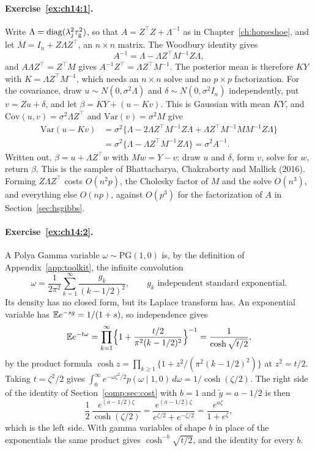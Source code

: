 \paragraph{Exercise~\ref{ex:ch14:1}.} Write $\Lambda = \mathrm{diag}(\lambda_j^2\tau_{\mathrm{g}}^2)$, so that $A = Z^\top Z + \Lambda^{-1}$ as in Chapter~\ref{ch:horseshoe}, and let $M = I_n + Z\Lambda Z^\top$, an $n \times n$ matrix. The Woodbury identity gives
\[
A^{-1} = \Lambda - \Lambda Z^\top M^{-1} Z\Lambda,
\]
and $A\Lambda Z^\top = Z^\top M$ gives $A^{-1}Z^\top = \Lambda Z^\top M^{-1}$. The posterior mean is therefore $KY$ with $K = \Lambda Z^\top M^{-1}$, which needs an $n \times n$ solve and no $p \times p$ factorization. For the covariance, draw $u \sim N(0, \sigma^2\Lambda)$ and $\delta \sim N(0, \sigma^2 I_n)$ independently, put $v = Zu + \delta$, and let $\beta = KY + (u - Kv)$. This is Gaussian with mean $KY$, and $\mathrm{Cov}(u, v) = \sigma^2\Lambda Z^\top$ and $\mathrm{Var}(v) = \sigma^2 M$ give
\begin{align*}
\mathrm{Var}(u - Kv) &= \sigma^2\bigl\{\Lambda - 2\Lambda Z^\top M^{-1}Z\Lambda + \Lambda Z^\top M^{-1}MM^{-1}Z\Lambda\bigr\}\\
&= \sigma^2\bigl\{\Lambda - \Lambda Z^\top M^{-1}Z\Lambda\bigr\} = \sigma^2 A^{-1}.
\end{align*}
Written out, $\beta = u + \Lambda Z^\top w$ with $Mw = Y - v$: draw $u$ and $\delta$, form $v$, solve for $w$, return $\beta$. This is the sampler of Bhattacharya, Chakraborty and Mallick (2016). Forming $Z\Lambda Z^\top$ costs $O(n^2p)$, the Cholesky factor of $M$ and the solve $O(n^3)$, and everything else $O(np)$, against $O(p^3)$ for the factorization of $A$ in Section~\ref{sec:hsgibbs}.

\paragraph{Exercise~\ref{ex:ch14:2}.} A Polya Gamma variable $\omega \sim \mathrm{PG}(1, 0)$ is, by the definition of Appendix~\ref{app:toolkit}, the infinite convolution
\[
\omega = \frac{1}{2\pi^2}\sum_{k=1}^\infty \frac{g_k}{(k - 1/2)^2}, \qquad g_k \text{ independent standard exponential}.
\]
Its density has no closed form, but its Laplace transform has. An exponential variable has $\mathbb{E} e^{-sg} = 1/(1 + s)$, so independence gives
\[
\mathbb{E} e^{-t\omega} = \prod_{k=1}^\infty \Bigl\{1 + \frac{t/2}{\pi^2(k - 1/2)^2}\Bigr\}^{-1} = \frac{1}{\cosh\sqrt{t/2}},
\]
by the product formula $\cosh z = \prod_{k \ge 1}\{1 + z^2/(\pi^2(k - 1/2)^2)\}$ at $z^2 = t/2$. Taking $t = \zeta^2/2$ gives $\int_0^\infty e^{-\omega\zeta^2/2}p(\omega \mid 1, 0)\,d\omega = 1/\cosh(\zeta/2)$. The right side of the identity of Section~\ref{comp:sec:cost} with $b = 1$ and $\tilde y = a - 1/2$ is then
\[
\frac12\,\frac{e^{(a - 1/2)\zeta}}{\cosh(\zeta/2)} = \frac{e^{(a - 1/2)\zeta}}{e^{\zeta/2} + e^{-\zeta/2}} = \frac{e^{a\zeta}}{1 + e^{\zeta}},
\]
which is the left side. With gamma variables of shape $b$ in place of the exponentials the same product gives $\cosh^{-b}\sqrt{t/2}$, and the identity for every $b$.

